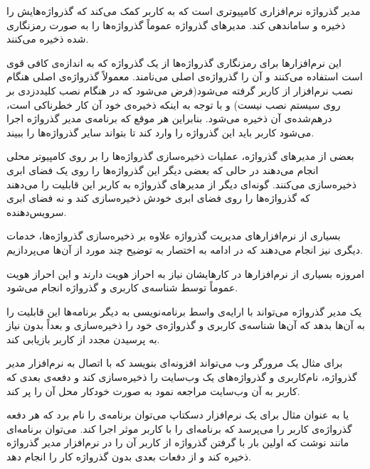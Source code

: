 
مدیر گذرواژه نرم‌افزاری کامپیوتری است که به کاربر کمک می‌کند که گذرواژه‌هایش را ذخیره و ساماندهی کند. مدیر‌های گذرواژه عموماً گذرواژه‌ها را به صورت رمزنگاری شده ذخیره می‌کنند. 

این نرم‌افزارها برای رمزنگاری گذرواژه‌ها از یک گذرواژه‌ که به اندازه‌ی کافی قوی است استفاده می‌کنند و آن را گذرواژه‌ی اصلی می‌نامند. معمولاً گذرواژه‌ی اصلی هنگام نصب نرم‌افزار از کاربر گرفته می‌شود(فرض می‌شود که در هنگام نصب کلیددزدی بر روی سیستم نصب نیست) و با توجه به اینکه ذخیره‌ی خود آن کار خطرناکی است، درهم‌شده‌ی آن ذخیره می‌شود. بنابر‌این هر موقع که برنامه‌ی مدیر گذرواژه اجرا می‌شود کاربر باید این گذرواژه را وارد کند تا بتواند سایر گذرواژه‌ها را ببیند.

بعضی از مدیر‌های گذرواژه، عملیات ذخیره‌سازی گذرواژه‌ها را بر روی کامپیوتر محلی انجام می‌دهند در حالی که بعضی دیگر این گذرواژه‌ها را روی یک فضای ابری ذخیره‌سازی می‌کنند. گونه‌ای دیگر از مدیر‌های گذرواژه  به کاربر این قابلیت را می‌دهند که گذرواژه‌ها را روی فضای ابری خودش ذخیره‌سازی کند و نه فضای ابری سرویس‌دهنده.

بسیاری از نرم‌افزار‌های مدیریت گذرواژه علاوه بر ذخیره‌سازی گذرواژه‌ها، خدمات دیگری نیز انجام می‌دهند که در ادامه به اختصار به توضیح چند مورد از آن‌ها می‌پردازیم.


امروزه بسیاری از نرم‌افزارها در کارهایشان نیاز به احراز هویت دارند و این احراز هویت عموماً توسط شناسه‌ی کاربری و گذرواژه انجام می‌شود. 

یک مدیر گذرواژه می‌تواند با ارایه‌ی واسط برنامه‌نویسی به دیگر برنامه‌ها این قابلیت را به آن‌ها بدهد که آن‌ها شناسه‌ی کاربری و گذرواژه‌ی خود را ذخیره‌سازی و بعداً بدون نیاز به پرسیدن مجدد از کاربر بازیابی کند.

برای مثال یک مرورگر وب می‌تواند افزونه‌ای بنویسد که با اتصال به نرم‌افزار مدیر گذرواژه، نام‌کاربری و گذرواژه‌های یک وب‌سایت را ذخیره‌سازی کند و دفعه‌ی بعدی که کاربر به آن وب‌سایت مراجعه نمود به صورت خودکار محل آن را پر کند. 

یا به عنوان مثال برای یک نرم‌افزار دسکتاپ می‌توان برنامه‌ی  را نام برد که هر دفعه گذرواژه‌ی کاربر را می‌پرسد که برنامه‌ای را با کاربر موثر  اجرا کند. می‌توان برنامه‌ای مانند  نوشت که اولین بار با گرفتن گذرواژه از کاربر آن را در نرم‌افزار مدیر گذرواژه ذخیره کند و از دفعات بعدی بدون گذرواژه کار را انجام دهد.

